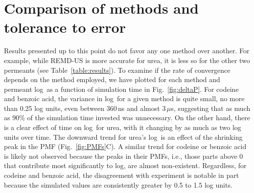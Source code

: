 %

\section*{Comparison of methods and tolerance to error}
  \par Results presented up to this point do not favor any one method over another.  For example, while REMD-US is more accurate for urea, it is less so for the other two permeants (see Table~\ref{table:results}).  To examine if the rate of convergence depends on the method employed, we have plotted for each method and permeant log\perm~as a function of simulation time in Fig.~\ref{fig:deltaP}.  For codeine and benzoic acid, the variance in log\perm~for a given method is quite small, no more than 0.25 log units, even between 360\,ns and almost 3\,$\mu$s, suggesting that as much as 90\% of the simulation time invested was unnecessary.  On the other hand, there is a clear effect of time on log\perm~for urea, with it changing by as much as two log units over time.   The downward trend for urea's log\perm~is an effect of the shrinking peak in the PMF (Fig.~\ref{fig:PMFs}C).   A similar trend for codeine or benzoic acid is likely not observed because the peaks in their PMFs, i.e., those parts above 0 that contribute most significantly to log\perm, are almost non-existent.   Regardless, for codeine and benzoic acid, the disagreement with experiment is notable in part because the simulated values are consistently greater by 0.5 to 1.5 log units.



